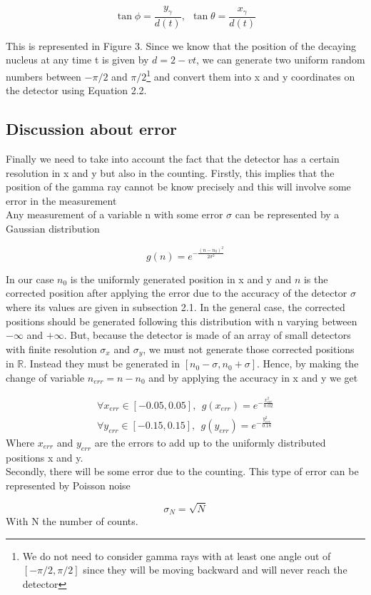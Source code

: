 \documentclass[10 pt]{article}
\numberwithin{equation}{section}
\begin{document}
\begin{multicols}{2}
\begin{equation}
\tan \phi = \frac{y_{\gamma}}{d(t)},\ \ \tan \theta = \frac{x_{\gamma}}{d(t)}
\end{equation}

This is represented in Figure 3. Since we know that the position of the decaying nucleus at any time t is given by $d = 2 - vt$, we can generate two uniform random numbers between $-\pi /2$ and $\pi/2$\footnote{We do not need to consider gamma rays with at least one angle out of $[-\pi/2, \pi/2]$ since they will be moving backward and will never reach the detector}  and convert them into x and y coordinates on the detector using Equation 2.2.

\subsection{Discussion about error}
Finally we need to take into account the fact that the detector has a certain resolution in x and y but also in the counting. Firstly, this implies that the position of the gamma ray cannot be know precisely and this will involve some error in the measurement\\
Any measurement of a variable n with some error $\sigma$ can be represented by a Gaussian distribution\cite{GogoBongo}

\begin{equation}
g(n) = e^{- \frac{(n - n_0)^2}{2\sigma^2}}
\end{equation}

In our case $n_0$ is the uniformly generated position in x and y and $n$ is the corrected position after applying the error due to the accuracy of the detector $\sigma$ where its values are given in subsection 2.1. In the general case, the corrected positions should be generated following this distribution with n varying between $-\infty$ and $+\infty$.
But, because the detector is made of an array of small detectors with finite resolution $\sigma_x$ and $\sigma_y$, we must not generate those corrected positions in $\mathbb{R}$. Instead they must be generated in $[n_0 - \sigma , n_0 + \sigma]$. Hence, by making the change of variable $n_{err} = n - n_0$ and by applying the accuracy in x and y we get

\begin{equation}
\begin{gathered}
\forall x_{err} \in [-0.05,0.05],\ \ g(x_{err}) = e^{-\frac{x_{err}^2}{0.02}}\\
\forall y_{err} \in [-0.15,0.15],\ \ g(y_{err}) = e^{-\frac{y_{err}^2}{0.18}}
\end{gathered}
\end{equation}
Where $x_{err}$ and $y_{err}$ are the errors to add up to the uniformly distributed positions x and y.\\
Secondly, there will be some error due to the counting. This type of error can be represented by Poisson noise\cite{GogoBongo}

\begin{equation}
\sigma_N = \sqrt{N}
\end{equation}
With N the number of counts.

\end{multicols}
\end{document}
